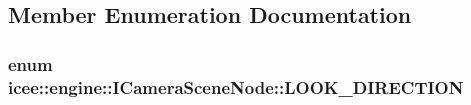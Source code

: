 \subsection{Member Enumeration Documentation}
\hypertarget{classicee_1_1engine_1_1ICameraSceneNode_ad7a023986a81f07295135d249c0f00aa}{
\subsubsection[{LOOK\_\-DIRECTION}]{\setlength{\rightskip}{0pt plus 5cm}enum {\bf icee::engine::ICameraSceneNode::LOOK\_\-DIRECTION}}}
\label{classicee_1_1engine_1_1ICameraSceneNode_ad7a023986a81f07295135d249c0f00aa}
